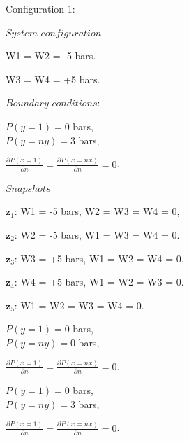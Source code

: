\documentclass[12pt]{article}
\begin{document}
\begin{itemize}
\item[] Configuration 1:\\
\begin{minipage}{.6\textwidth}
\item[]  $System$ $configuration$ 
 \item[]  W1 =  W2 = -5 bars.
 \item[] W3 = W4 = +5 bars.
\end{minipage}%
\begin{minipage}{.4\textwidth}
\item[] $Boundary$ $conditions:$
\item[] $P(y=1) = 0$ bars,\\ $P(y=ny) = 3$ bars,
\item[] $\frac{\partial P(x=1)}{\partial n}=\frac{\partial P(x=nx)}{\partial n}=0$.
\end{minipage}
\begin{minipage}{.6\textwidth}
\item[]  $Snapshots$ 
 \item[] $\mathbf{z}_1$: W1 = -5 bars, W2 = W3 = W4 = 0, 
\item[] $\mathbf{z}_2$: W2 = -5 bars, W1 = W3 = W4 = 0.
\item[] $\mathbf{z}_3$: W3 = +5 bars, W1 = W2 = W4 = 0.
\item[] $\mathbf{z}_4$: W4 = +5 bars, W1 = W2 = W3 = 0.
\item[]
\item[] $\mathbf{z}_5$: W1 =  W2 =  W3 = W4 = 0.
\end{minipage}%
\begin{minipage}{.4\textwidth}
\item[]
\item[]
\item[] %
\item[] $P(y=1) = 0$ bars,\\ $P(y=ny) = 0$ bars,
\item[] $\frac{\partial P(x=1)}{\partial n}=\frac{\partial P(x=nx)}{\partial n}=0$.
\item[]
\item[] %
\item[] $P(y=1) = 0$ bars,\\ $P(y=ny) = 3$ bars,
\item[] $\frac{\partial P(x=1)}{\partial n}=\frac{\partial P(x=nx)}{\partial n}=0$.
\end{minipage}
\end{itemize}
\end{document}
